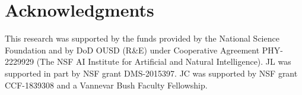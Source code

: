 \section*{Acknowledgments}
This research was supported by the funds provided by the National Science Foundation and by DoD OUSD (R\&E) under Cooperative Agreement PHY-2229929 (The NSF AI Institute for Artificial and Natural Intelligence). JL was supported in part by NSF grant DMS-2015397. JC was supported by NSF grant CCF-1839308 and a Vannevar Bush Faculty Fellowship.